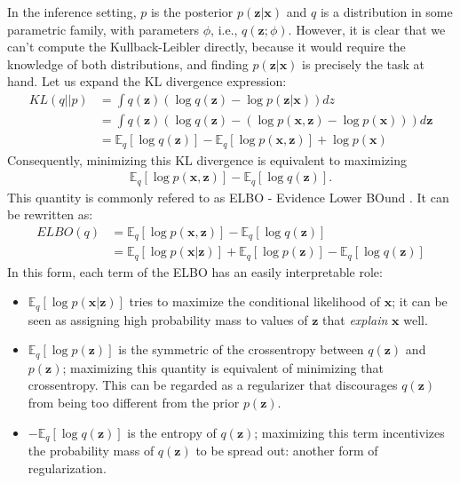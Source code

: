 In the inference setting, $p$ is the posterior $p(\bm{z}|\bm{x})$ and $q$ is a distribution
in some parametric family, with parameters $\phi$, i.e., $q(\bm{z}; \phi)$. However,
it is clear that we can't compute the Kullback-Leibler directly, because it
would require the knowledge of both distributions, and finding $p(\bm{z}|\bm{x})$ is
precisely the task at hand. Let us expand the KL divergence expression:
\begin{align}
    KL(q||p) &= \int q(\bm{z}) (\log q(\bm{z}) - \log p(\bm{z}|\bm{x})) dz \\
             &= \int q(\bm{z}) (\log q(\bm{z}) - (\log p(\bm{x}, \bm{z}) - \log p(\bm{x}))) d\bm{z} \\
             &= \mathbb{E}_q [\log q(\bm{z})] - \mathbb{E}_q [\log p(\bm{x}, \bm{z})] + \log p(\bm{x})
\end{align}
Consequently, minimizing this KL divergence is equivalent to maximizing
\begin{align}
    \mathbb{E}_q [\log p(\bm{x}, \bm{z})] - \mathbb{E}_q [\log q(\bm{z})]. \label{eq:elbokldiv}
\end{align} This quantity is commonly refered to as ELBO - Evidence Lower BOund \autocite{Blei2016Jan}.
It can be rewritten as:
\begin{align}
    ELBO(q) &= \mathbb{E}_q [\log p(\bm{x}, \bm{z})] - \mathbb{E}_q [\log q(\bm{z})] \\
            &= \mathbb{E}_q [\log p(\bm{x}|\bm{z})] + \mathbb{E}_q [\log p(\bm{z})] - \mathbb{E}_q [\log q(\bm{z})]
\end{align}
In this form, each term of the ELBO has an easily interpretable role:
\begin{itemize}
    \item $\mathbb{E}_q [\log p(\bm{x}|\bm{z})]$ tries to maximize the conditional likelihood of $\bm{x}$; it
        can be seen as assigning high probability mass to values of $\bm{z}$ that \emph{explain} $\bm{x}$
        well.
    \item $\mathbb{E}_q [\log p(\bm{z})]$ is the symmetric of the crossentropy between
        $q(\bm{z})$ and $p(\bm{z})$; maximizing this quantity is equivalent of minimizing
        that crossentropy. This can be regarded as a regularizer that discourages
        $q(\bm{z})$ from being too different from the prior $p(\bm{z})$.
    \item $ - \mathbb{E}_q [\log q(\bm{z})]$ is the entropy of $q(\bm{z})$; maximizing
        this term incentivizes the probability mass of $q(\bm{z})$ to be spread out:
        another form of regularization.
\end{itemize}


